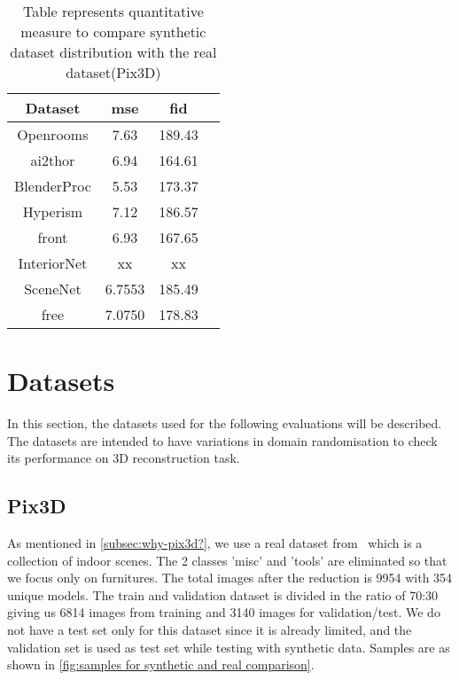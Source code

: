 \begin{table}[ht]
    \centering
    \begin{tabular}{|c |c |c |c|}
        \hline
        Dataset & \gls{mse} & \gls{fid} \\ [0.5ex]
        \hline\hline
        Openrooms & 7.63 & 189.43 \\
        \hline
        \gls{ai2thor} & 6.94 & 164.61 \\
        \hline
        BlenderProc & 5.53 & 173.37 \\
        \hline
        Hyperism & 7.12 & 186.57 \\
        \hline
        \gls{front} & 6.93 & 167.65 \\
        \hline
        InteriorNet & xx & xx \\
        \hline
        SceneNet & 6.7553 & 185.49 \\
        \hline
        \gls{free} & 7.0750 & 178.83 \\[1ex]
        \hline
    \end{tabular}
    \caption{Table represents quantitative measure to compare synthetic dataset distribution with the real dataset(Pix3D)}
    \label{tab:quantitative-dataset-comparison}
\end{table}

\section{Datasets}\label{sec:datasets}
In this section, the datasets used for the following evaluations will be described.
The datasets are intended to have variations in domain randomisation to check its performance on 3D reconstruction task.

\subsection{Pix3D}
As mentioned in \autoref{subsec:why-pix3d?}, we use a real dataset from~\cite{pix3d} which is a collection of indoor scenes.
The 2 classes 'misc' and 'tools' are eliminated so that we focus only on furnitures.
The total images after the reduction is 9954 with 354 unique models.
The train and validation dataset is divided in the ratio of 70:30 giving us 6814 images from training and 3140 images for validation/test.
We do not have a test set only for this dataset since it is already limited, and the validation set is used as test set while testing with synthetic data.
Samples are as shown in \autoref{fig:samples for synthetic and real comparison}.

